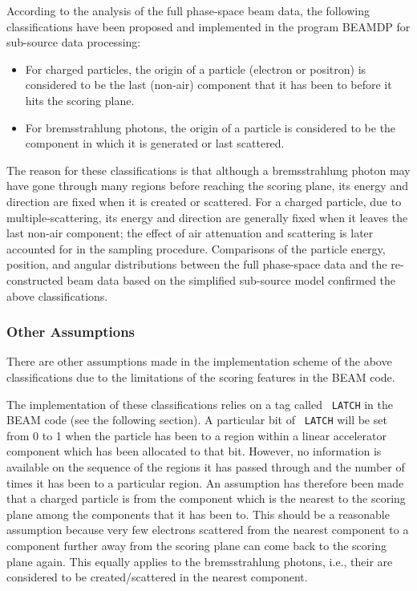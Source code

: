 \documentclass[12pt,twoside]{article}
\begin{document}
According to the analysis of the full phase-space beam data, the following
classifications have been proposed and implemented in the program
BEAMDP\cite{MR95a} for sub-source data processing:

\setlength{\topsep}{0ex}   %
\setlength{\parskip}{0ex}
\setlength{\itemsep}{0ex}  %
\setlength{\parindent}{0em}
\begin{itemize}
\item
For charged particles, the origin of a particle (electron or positron) is
considered to be the last (non-air) component that it has been to before
it hits the scoring plane.
\item
For bremsstrahlung photons, the origin of a particle is considered to be
the component in which it is generated or last scattered.
\end{itemize}
\setlength{\parindent}{1.5em}
\setlength{\parskip}{0.1in}

The reason for these classifications is that although a bremsstrahlung
photon may have gone through many regions before reaching the scoring
plane, its energy and direction are fixed when it is created or scattered.
For a charged particle, due to multiple-scattering, its energy and
direction are generally fixed when it leaves the last non-air component;
the effect of air attenuation and scattering is later accounted for in the
sampling procedure. Comparisons of the particle energy, position, and
angular distributions between the full phase-space data and the
re-constructed beam data based on the simplified sub-source model
confirmed the above classifications.

\subsubsection{Other Assumptions}
There are other assumptions made in the implementation scheme of the above
classifications due to the limitations of the scoring features in the BEAM
code.

The implementation of these classifications relies on a tag called {\tt
LATCH}
in the BEAM code (see the following section). A particular bit of {\tt
LATCH}
will be set from 0 to 1 when the particle has been to a region within a
linear accelerator component which has been allocated to that bit.
However, no information is available on the sequence of the regions it has
passed through and the number of times it has been to a particular
region.  An assumption has therefore been made that a charged particle is
from the component which is the nearest to the scoring plane among the
components that it has been to. This should be a reasonable assumption
because very few electrons scattered from the nearest component to a
component further away from the scoring plane can come back to the scoring
plane again. This equally applies to the bremsstrahlung photons, i.e.,
their are considered to be created/scattered in the nearest component.
\end{document}
